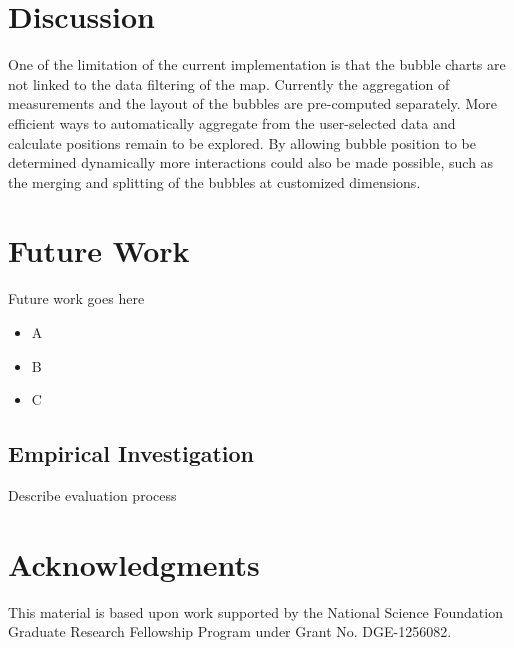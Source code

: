 \documentclass{sigchi}
\begin{document}
\section{Discussion}
One of the limitation of the current implementation is that the bubble charts are not linked to the data filtering of the map. Currently the aggregation of measurements and the layout of the bubbles are pre-computed separately. More efficient ways to automatically aggregate from the user-selected data and calculate positions remain to be explored. By allowing bubble position to be determined dynamically more interactions could also be made possible, such as the merging and splitting of the bubbles at customized dimensions.


\section{Future Work}
Future work goes here
\begin{itemize}
\item A 
\item B
\item C

\end{itemize}

\subsection{Empirical Investigation}
Describe evaluation process

\section{Acknowledgments}

This material is based upon work supported by the National Science Foundation
Graduate Research Fellowship Program under Grant No. DGE-1256082.

%
%
%
%
%
\balance



\end{document}
